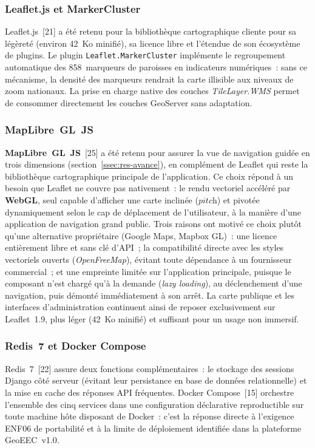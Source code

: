 \documentclass[12pt, a4paper]{report}
\begin{document}
\subsubsection{Leaflet.js et MarkerCluster}

Leaflet.js~[21] a été retenu pour la bibliothèque
cartographique cliente pour sa légèreté (environ 42~Ko minifié), sa licence
libre et l'étendue de son écosystème de plugins. Le plugin
\texttt{Leaflet.MarkerCluster} implémente le regroupement automatique des
858~marqueurs de paroisses en indicateurs numériques~: sans ce mécanisme,
la densité des marqueurs rendrait la carte illisible aux niveaux de zoom
nationaux. La prise en charge native des couches \textit{TileLayer.WMS}
permet de consommer directement les couches GeoServer sans adaptation.

\subsubsection{MapLibre~GL~JS}
\label{ssec:justification-maplibre}

\textbf{MapLibre~GL~JS}~[25] a été retenu pour assurer la vue de navigation
guidée en trois dimensions (section~\ref{ssec:res-avance}), en complément de
Leaflet qui reste la bibliothèque cartographique principale de
l'application. Ce choix répond à un besoin que Leaflet ne couvre pas
nativement~: le rendu vectoriel accéléré par \textbf{WebGL}, seul capable
d'afficher une carte inclinée ($\textit{pitch}$) et pivotée dynamiquement
selon le cap de déplacement de l'utilisateur, à la manière d'une application
de navigation grand public. Trois raisons ont motivé ce choix plutôt qu'une
alternative propriétaire (Google Maps, Mapbox GL)~: une licence entièrement
libre et sans clé d'API~; la compatibilité directe avec les styles
vectoriels ouverts (\textit{OpenFreeMap}), évitant toute dépendance à un
fournisseur commercial~; et une empreinte limitée sur l'application
principale, puisque le composant n'est chargé qu'à la demande
(\textit{lazy loading}), au déclenchement d'une navigation, puis démonté
immédiatement à son arrêt. La carte publique et les interfaces
d'administration continuent ainsi de reposer exclusivement sur Leaflet~1.9,
plus léger (42~Ko minifié) et suffisant pour un usage non immersif.

\subsubsection{Redis~7 et Docker Compose}

Redis~7~[22] assure deux fonctions complémentaires~:
le stockage des sessions Django côté serveur (évitant leur persistance
en base de données relationnelle) et la mise en cache des réponses API
fréquentes. Docker Compose~[15] orchestre l'ensemble des
cinq services dans une configuration déclarative reproductible sur toute
machine hôte disposant de Docker~: c'est la réponse directe à l'exigence
ENF06 de portabilité et à la limite de déploiement identifiée dans la
plateforme GeoEEC~v1.0.
\end{document}
